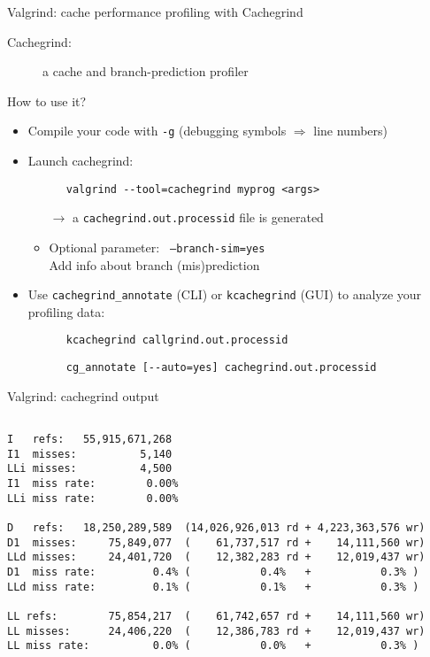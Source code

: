 \documentclass[10pt,xcolor=table]{beamer}
\begin{document}
\begin{frame}[fragile]{Valgrind: cache performance profiling with Cachegrind}

  \begin{description}
  \item[Cachegrind:] a cache and branch-prediction profiler
  \end{description}

  How to use it?
  \begin{itemize}
  \item Compile your code with {\tt -g} (debugging symbols
    $\Rightarrow$ line numbers)
  \item Launch cachegrind:
    \begin{lstlisting}
      valgrind --tool=cachegrind myprog <args>
    \end{lstlisting}
    \begin{itemize}
    \item[$\rightarrow$] a {\tt cachegrind.out.processid} file is
      generated
    \item<2>[$\rightarrow$] Optional parameter: {\tt
        --branch-sim=yes}\\
      Add info about branch (mis)prediction
    \end{itemize}
  \item Use {\tt cachegrind\_annotate} (CLI) or {\tt kcachegrind}
    (GUI) to analyze your profiling data:
    \begin{lstlisting}
      kcachegrind callgrind.out.processid
    \end{lstlisting}

    \begin{lstlisting}
      cg_annotate [--auto=yes] cachegrind.out.processid
    \end{lstlisting}
  \end{itemize}
\end{frame}

\begin{frame}[fragile]{Valgrind: cachegrind output}

  \vspace*{-0.5cm}

  \begin{lstlisting}[style=valgrind,caption={Cachegrind
      output: recap}]

I   refs:   55,915,671,268
I1  misses:          5,140
LLi misses:          4,500
I1  miss rate:        0.00%
LLi miss rate:        0.00%

D   refs:   18,250,289,589  (14,026,926,013 rd + 4,223,363,576 wr)
D1  misses:     75,849,077  (    61,737,517 rd +    14,111,560 wr)
LLd misses:     24,401,720  (    12,382,283 rd +    12,019,437 wr)
D1  miss rate:         0.4% (           0.4%   +           0.3% )
LLd miss rate:         0.1% (           0.1%   +           0.3% )

LL refs:        75,854,217  (    61,742,657 rd +    14,111,560 wr)
LL misses:      24,406,220  (    12,386,783 rd +    12,019,437 wr)
LL miss rate:          0.0% (           0.0%   +           0.3% )
  \end{lstlisting}

\end{frame}
\end{document}
